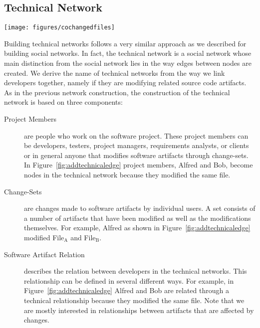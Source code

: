 \subsection{Technical Network}
\begin{figure*}[t!]
\centering
\texttt{[image: figures/cochangedfiles]}
\caption{Creating a technical network by connecting developers that changed the same file.}
\label{fig:addtechnicaledge}
\end{figure*}

Building technical networks follows a very similar approach as we described for building social networks.
In fact, the technical network is a social network whose main distinction from the social network  lies in the way edges between nodes are created.
We derive the name of technical networks from the way we link developers together, namely if they are modifying related source code artifacts.
As in the previous network construction, the construction of the technical network is based on three components:

\begin{description}
\item[Project Members] are people who work on the software project. 
These project members can be developers, testers, project managers, requirements analysts,
or clients or in general anyone that modifies software artifacts through change-sets. 
In Figure~\ref{fig:addtechnicaledge} project members, Alfred and Bob, become nodes in the technical network because they modified the same file.

\item[Change-Sets] are changes made to software artifacts by individual users. 
A set consists of a number of artifacts that have been modified as well as the modifications themselves.
For example, Alfred as shown in Figure~\ref{fig:addtechnicaledge} modified File$_{\text{A}}$ and File$_{\text{B}}$.

\item[Software Artifact Relation] describes the relation between developers in the technical networks.
This relationship can be defined in several different ways.
For example, in Figure~\ref{fig:addtechnicaledge} Alfred and Bob are related through a technical relationship because they modified the same file.
Note that we are mostly interested in relationships between artifacts that are affected by changes.
\end{description}


